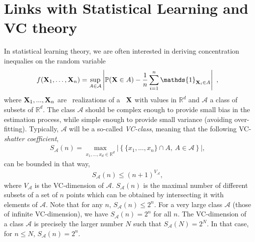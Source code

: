 \section{Links with Statistical Learning and VC theory}
In statistical learning theory, we are often interested in deriving concentration inequalies on the random variable 
$$f(\mb X_1,\ldots,\mb X_n)= \sup_{A \in \mathcal{A}} \left | \mathbb{P}(\mb X \in A) - \frac{1}{n} \sum_{i=1}^n \mathds{1}_{\mb X_i \in A} \right|~,$$
where $\mathbf X_1,...,\mathbf X_n$ are \iid~realizations of a \rv~$\mathbf X$ with values in $\mathbb{R}^d$ and $\mathcal{A}$ a class of subsets of $\mathbb{R}^d$.
The class $\mathcal{A}$ should be complex enough to provide small bias in the estimation process, while simple enough to provide small variance (avoiding over-fitting). Typically, $\mathcal{A}$ will be a so-called \emph{VC-class}, meaning that the following VC-\emph{shatter coefficient},
\begin{align}
S_{\mathcal{A}}(n) = \max_{ x_1,\ldots,x_d \in \mathbb{R}^d}  \left| \left\{ \{x_1,\ldots, x_n\} \cap A,~A\in \mathcal{A} \right\} \right|,
\end{align}
can be bounded in that way,
\begin{align}
S_{\mathcal{A}}(n) \le (n+1)^{V_\mathcal{A}},
\end{align}
where $V_\mathcal{A}$ is the VC-dimension of $\mathcal{A}$. 
$S_{\mathcal{A}}(n)$ is the maximal number of different subsets of a set of $n$ points which can be obtained by intersecting it with elements of $\mathcal{A}$. Note that for any $n$, $S_{\mathcal{A}}(n) \le 2^n$. For a very large class $\mathcal{A}$ (those of infinite VC-dimension), we have $S_{\mathcal{A}}(n) = 2^n$ for all $n$. The VC-dimension of a class $\mathcal{A}$ is precisely the larger number $N$ such that $S_{\mathcal{A}}(N) = 2^N$. In that case, for $n \le N$, $S_{\mathcal{A}}(n) = 2^n$.

